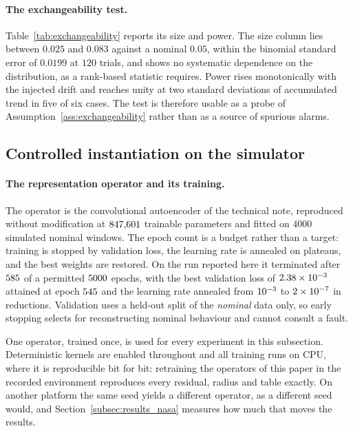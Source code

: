 \documentclass[a4paper]{cas-sc}
\begin{document}
\paragraph{The exchangeability test.}
Table~\ref{tab:exchangeability} reports its size and power. The size column
lies between \(0.025\) and \(0.083\) against a nominal \(0.05\), within the
binomial standard error of \(0.0199\) at \(120\) trials, and shows no
systematic dependence on the distribution, as a rank-based statistic requires.
Power rises monotonically with the injected drift and reaches unity at two
standard deviations of accumulated trend in five of six cases. The test is
therefore usable as a probe of Assumption~\ref{ass:exchangeability} rather
than as a source of spurious alarms.



\subsection{Controlled instantiation on the simulator}
\label{subsec:results_simulator}

\paragraph{The representation operator and its training.}
The operator is the convolutional autoencoder of the technical note,
reproduced without modification at \(847{,}601\) trainable parameters and
fitted on \(4000\) simulated nominal windows. The epoch count is a budget
rather than a target: training is stopped by validation loss, the learning
rate is annealed on plateaus, and the best weights are restored. On the run
reported here it terminated after \(585\) of a permitted \(5000\) epochs, with
the best validation loss of \(2.38\times10^{-3}\) attained at epoch \(545\)
and the learning rate annealed from \(10^{-3}\) to \(2\times10^{-7}\) in \trainLrReductions{}
reductions. Validation uses a held-out split of the \emph{nominal} data only,
so early stopping selects for reconstructing nominal behaviour and cannot
consult a fault.

One operator, trained once, is used for every experiment in this subsection.
Deterministic kernels are enabled throughout and all training runs on CPU,
where it is reproducible bit for bit: retraining the operators of this paper
in the recorded environment reproduces every residual, radius and table
exactly. On another platform the same seed yields a different operator, as a
different seed would, and Section~\ref{subsec:results_nasa} measures how much
that moves the results.
\end{document}
